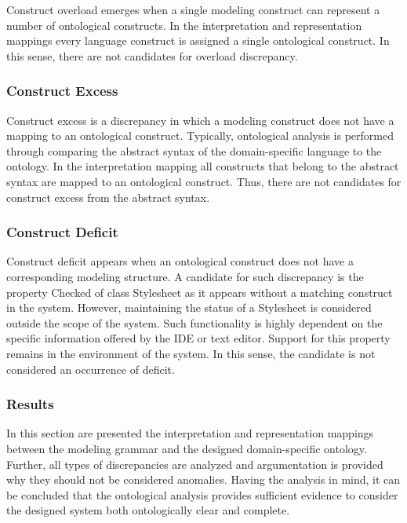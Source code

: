 \documentclass[parskip=full]{uvamscse}
\begin{document}
Construct overload emerges when a single modeling construct can represent a number of ontological
constructs. In the interpretation and representation mappings every language construct is assigned a
single ontological construct. In this sense, there are not candidates for overload discrepancy.

\subsubsection{Construct Excess}

Construct excess is a discrepancy in which a modeling construct does not have a mapping to an
ontological construct. Typically, ontological analysis is performed through comparing the abstract
syntax of the domain-specific language to the ontology. In the interpretation mapping all constructs
that belong to the abstract syntax are mapped to an ontological construct. Thus, there are not
candidates for construct excess from the abstract syntax.

\subsubsection{Construct Deficit}

Construct deficit appears when an ontological construct does not have a corresponding modeling
structure. A candidate for such discrepancy is the property Checked of class Stylesheet as it
appears without a matching construct in the system. However, maintaining the status of a Stylesheet
is considered outside the scope of the system. Such functionality is highly dependent on the
specific information offered by the IDE or text editor. Support for this property remains in the
environment of the system. In this sense, the candidate is not considered an occurrence of deficit.


\subsubsection{Results}

In this section are presented the interpretation and representation mappings between the modeling
grammar and the designed domain-specific ontology. Further, all types of discrepancies are analyzed
and argumentation is provided why they should not be considered anomalies. Having the analysis in
mind, it can be concluded that the ontological analysis provides sufficient evidence to consider the
designed system both ontologically clear and complete.
\end{document}
